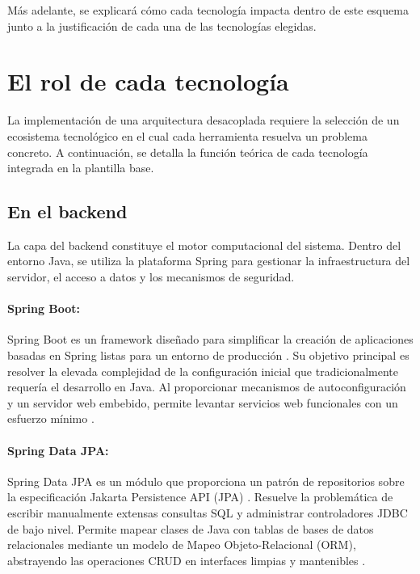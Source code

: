 	\begin{notabox}
		M\'as adelante, se explicar\'a c\'omo cada tecnolog\'ia impacta dentro de este esquema junto a la justificaci\'on de cada una de las tecnolog\'ias elegidas.
	\end{notabox}
	
	\newpage
	
	\section{El rol de cada tecnolog\'ia}
	La implementaci\'on de una arquitectura desacoplada requiere la selecci\'on de un ecosistema tecnol\'ogico en el cual cada herramienta resuelva un problema concreto. A continuaci\'on, se detalla la funci\'on te\'orica de cada tecnolog\'ia integrada en la plantilla base.
	
	\subsection{En el backend}
	La capa del backend constituye el motor computacional del sistema. Dentro del entorno Java, se utiliza la plataforma Spring para gestionar la infraestructura del servidor, el acceso a datos y los mecanismos de seguridad.
	
	\paragraph{Spring Boot:} Spring Boot es un framework diseñado para simplificar la creaci\'on de aplicaciones basadas en Spring listas para un entorno de producci\'on \cite{spring-boot}. Su objetivo principal es resolver la elevada complejidad de la configuraci\'on inicial que tradicionalmente requer\'ia el desarrollo en Java. Al proporcionar mecanismos de autoconfiguraci\'on y	 un servidor web embebido, permite levantar servicios web funcionales con un esfuerzo m\'inimo \cite{spring-boot}.
	
	\paragraph{Spring Data JPA:} Spring Data JPA es un m\'odulo que proporciona un patr\'on de repositorios sobre la especificaci\'on Jakarta Persistence API (JPA) \cite{spring-data-jpa}. Resuelve la problem\'atica de escribir manualmente extensas consultas SQL y administrar controladores JDBC de bajo nivel. Permite mapear clases de Java con tablas de bases de datos relacionales mediante un modelo de Mapeo Objeto-Relacional (ORM), abstrayendo las operaciones CRUD en interfaces limpias y mantenibles \cite{spring-data-jpa}.
	

